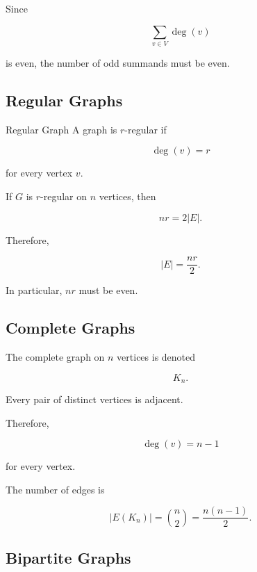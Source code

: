 Since

\[
\sum_{v\in V}\deg(v)
\]

is even, the number of odd summands must be even.

\subsection{Regular Graphs}
\label{subsec:regular-graphs}

\begin{definitionbox}{Regular Graph}
A graph is \(r\)-regular if

\[
\boxed{
\deg(v)=r
}
\]

for every vertex \(v\).
\end{definitionbox}

If \(G\) is \(r\)-regular on \(n\) vertices, then

\[
nr=2|E|.
\]

Therefore,

\[
\boxed{
|E|=\frac{nr}{2}.
}
\]

In particular, \(nr\) must be even.

\subsection{Complete Graphs}
\label{subsec:complete-graphs}

The complete graph on \(n\) vertices is denoted

\[
\boxed{
K_n.
}
\]

Every pair of distinct vertices is adjacent.

Therefore,

\[
\deg(v)=n-1
\]

for every vertex.

The number of edges is

\[
\boxed{
|E(K_n)|
=
\binom{n}{2}
=
\frac{n(n-1)}{2}.
}
\]

\subsection{Bipartite Graphs}
\label{subsec:bipartite-graphs}

